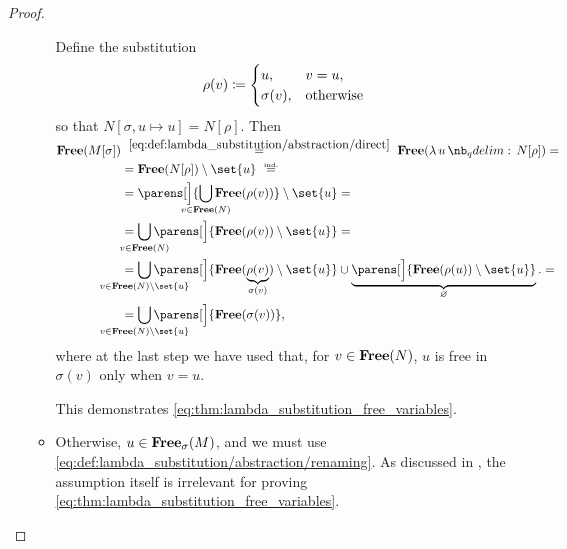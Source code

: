 \begin{proof}
\begin{itemize}
\begin{itemize}
      Define the substitution
      \begin{equation*}
        \rho(v) \coloneqq \begin{cases}
          u,         &v = u, \\
          \sigma(v), &\T{otherwise}
        \end{cases}
      \end{equation*}
      so that \( N[\sigma, u \mapsto u] = N[\rho] \). Then
      \begin{align*}
        \op*{Free}(M[\sigma])
        &\reloset{\eqref{eq:def:lambda_substitution/abstraction/direct}} =
        \op*{Free}(\qabs u N[\rho])
        = \\ &=
        \op*{Free}(N[\rho]) \setminus \set{ u }
        \reloset{\T{ind.}} = \\ &=
        \parens[\Big]{ \bigcup_{\mathclap{v \in \op*{Free}(N)}} \op*{Free}(\rho(v)) } \setminus \set{ u }
        = \\ &=
        \bigcup_{\mathclap{v \in \op*{Free}(N)}} \parens[\Big]{ \op*{Free}(\rho(v)) \setminus \set{ u } }
        = \\ &=
        \bigcup_{\mathclap{v \in \op*{Free}(N) \setminus \set{ u }}} \parens[\Big]{ \op*{Free}(\underbrace{\rho(v)}_{\sigma(v)}) \setminus \set{ u } } \cup \underbrace{\parens[\Big]{ \op*{Free}(\rho(u)) \setminus \set{ u } }}_\varnothing.
        = \\ &=
        \bigcup_{\mathclap{v \in \op*{Free}(N) \setminus \set{ u }}} \parens[\Big]{ \op*{Free}(\sigma(v)) },
      \end{align*}
      where at the last step we have used that, for \( v \in \op*{Free}(N) \), \( u \) is free in \( \sigma(v) \) only when \( v = u \).

      This demonstrates \eqref{eq:thm:lambda_substitution_free_variables}.

      \item Otherwise, \( u \in \op*{Free}_\sigma(M) \), and we must use \eqref{eq:def:lambda_substitution/abstraction/renaming}. As discussed in , the assumption itself is irrelevant for proving \eqref{eq:thm:lambda_substitution_free_variables}.


\end{itemize}
\end{itemize}
\end{proof}
